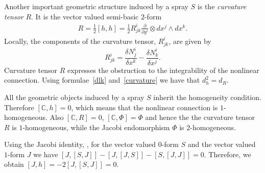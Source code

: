 \documentclass[pdftex]{sigma}
\numberwithin{equation}{section}
\begin{document}
Another important geometric structure induced by a spray $S$ is
the \emph{curvature tensor} $R$. It is the vector valued semi-basic $2$-form
\begin{gather} R=\frac{1}{2}[h,h]=\frac{1}{2}R^i_{jk}\frac{\partial}{\partial y^i}\otimes dx^j\wedge dx^k. \label{curvature}
\end{gather}
Locally, the components of the curvature tensor, $R^i_{jk}$, are given by
\[
R^i_{jk}=\frac{\delta N^i_j}{\delta x^k} - \frac{\delta N^i_k}{\delta
x^j}.
\] Curvature tensor $R$ expresses the obstruction to the
integrability of the nonlinear connection.  Using formulae~\eqref{dlk}
and~\eqref{curvature} we have that $d_h^2=d_R$.

All the geometric objects induced by a spray $S$ inherit the
homogeneity condition. Therefore $[\mathbb{C}, h]=0$, which means
that the nonlinear connection is $1$-homogeneous. Also $[\mathbb{C},
R]=0$, $[\mathbb{C},\Phi]=\Phi$ and hence the the curvature tensor $R$
is $1$-homogeneous, while the  Jacobi endomorphism $\Phi$
is $2$-homogeneous.

Using the Jacobi identity, \cite[Proposition~2.7]{grifone00} , for the vector valued $0$-form $S$ and the
vector valued $1$-form $J$ we have $[J,[S,J]]-[J,[J,S]]-[S,[J,J]]=0$.
Therefore, we obtain $[J,h]=-2[J,[S,J]]=0$.
\end{document}
